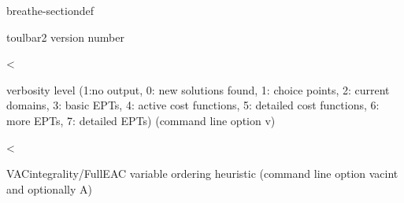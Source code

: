 \documentclass[letterpaper,10pt,openany,oneside,english]{sphinxmanual}
\begin{document}
\begin{fulllineitems}
\begin{sphinxuseclass}{breathe-sectiondef}
\begin{fulllineitems}
\sphinxAtStartPar
toulbar2 version number 

\end{fulllineitems}


\begin{fulllineitems}
\label{\detokenize{ref/ref_cpp:_CPPv4N8ToulBar27FullEACE}}\label{\detokenize{ref/ref_cpp:_CPPv3N8ToulBar27FullEACE}}\label{\detokenize{ref/ref_cpp:_CPPv2N8ToulBar27FullEACE}}\label{\detokenize{ref/ref_cpp:ToulBar2::FullEAC__b}}
\pysigstartsignatures
\pysigstartmultiline
{}
\pysigstopmultiline
\pysigstopsignatures
\sphinxAtStartPar
\textless{} 

\sphinxAtStartPar
verbosity level (\sphinxhyphen{}1:no output, 0: new solutions found, 1: choice points, 2: current domains, 3: basic EPTs, 4: active cost functions, 5: detailed cost functions, 6: more EPTs, 7: detailed EPTs) (command line option \sphinxhyphen{}v) 

\end{fulllineitems}


\begin{fulllineitems}
\label{\detokenize{ref/ref_cpp:_CPPv4N8ToulBar212VACthresholdE}}\label{\detokenize{ref/ref_cpp:_CPPv3N8ToulBar212VACthresholdE}}\label{\detokenize{ref/ref_cpp:_CPPv2N8ToulBar212VACthresholdE}}\label{\detokenize{ref/ref_cpp:ToulBar2::VACthreshold__b}}
\pysigstartsignatures
\pysigstartmultiline
{}
\pysigstopmultiline
\pysigstopsignatures
\sphinxAtStartPar
\textless{} 

\sphinxAtStartPar
VAC\sphinxhyphen{}integrality/Full\sphinxhyphen{}EAC variable ordering heuristic (command line option \sphinxhyphen{}vacint and optionally \sphinxhyphen{}A) 

\end{fulllineitems}


\end{sphinxuseclass}
\end{fulllineitems}
\end{document}
